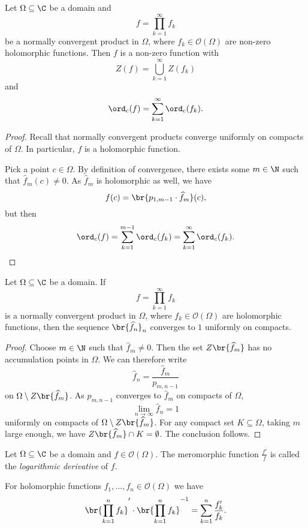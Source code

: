 \begin{lema}
Let $\Omega \subseteq \C$ be a domain and
\[
f = \prod_{k=1}^\infty f_k
\]
be a normally convergent product in $\Omega$, where
$f_k \in \mathcal{O}(\Omega)$ are non-zero holomorphic functions.
Then $f$ is a non-zero function with
\[
Z(f) = \bigcup_{k=1}^\infty Z(f_k)
\]
and
\[
\ord_c(f) = \sum_{k=1}^\infty \ord_c(f_k).
\]
\end{lema}

\begin{proof}
Recall that normally convergent products converge uniformly on
compacts of $\Omega$. In particular, $f$ is a holomorphic function.

Pick a point $c \in \Omega$. By definition of convergence, there
exists some $m \in \N$ such that $\widehat{f}_m(c) \ne 0$. As
$\widehat{f}_m$ is holomorphic as well, we have
\[
f(c) = \br{p_{1, m-1} \cdot \widehat{f}_m}(c),
\]
but then
\[
\ord_c(f) =
\sum_{k=1}^{m-1} \ord_c(f_k) =
\sum_{k=1}^\infty \ord_c(f_k). \qedhere
\]
\end{proof}

\begin{lema}
Let $\Omega \subseteq \C$ be a domain. If
\[
f = \prod_{k=1}^\infty f_k
\]
is a normally convergent product in $\Omega$, where
$f_k \in \mathcal{O}(\Omega)$ are holomorphic functions, then the
sequence $\br{\widehat{f}_n}_n$ converges to $1$ uniformly on
compacts.
\end{lema}

\begin{proof}
Choose $m \in \N$ such that $\widehat{f}_m \ne 0$. Then the set
$Z \br{\widehat{f}_m}$ has no accumulation points in $\Omega$. We
can therefore write
\[
\widehat{f}_n = \frac{\widehat{f}_m}{p_{m,n-1}}
\]
on $\Omega \setminus Z \br{\widehat{f}_m}$. As $p_{m,n-1}$
converges to $\widehat{f}_m$ on compacts of $\Omega$,
\[
\lim_{n \to \infty} \widehat{f}_n = 1
\]
uniformly on compacts of $\Omega \setminus Z \br{\widehat{f}_m}$.
For any compact set $K \subseteq \Omega$, taking $m$ large enough,
we have $Z \br{\widehat{f}_m} \cap K = \emptyset$. The conclusion
follows.
\end{proof}

\begin{definicija}
Let $\Omega \subseteq \C$ be a domain and
$f \in \mathcal{O}(\Omega)$. The meromorphic function
$\frac{f'}{f}$ is called the
\emph{logarithmic derivative} of $f$.
\end{definicija}

\begin{opomba}
For holomorphic functions $f_1, \dots, f_n \in \mathcal{O}(\Omega)$
we have
\[
\br{\prod_{k=1}^n f_k}' \cdot \br{\prod_{k=1}^n f_k}^{-1} =
\sum_{k=1}^n \frac{f_k'}{f_k}.
\]
\end{opomba}

